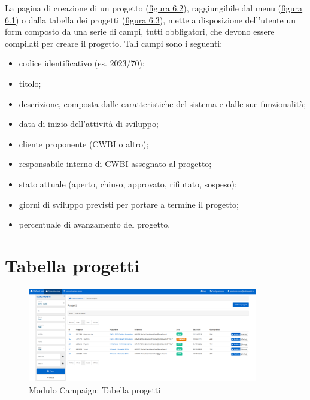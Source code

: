 \noindent La pagina di creazione di un progetto ({\hyperref[fig:nuovoProgetto]{figura 6.2}}), raggiungibile dal menu ({\hyperref[fig:menu]{figura 6.1}}) o dalla tabella dei progetti ({\hyperref[fig:tabellaProgetti]{figura 6.3}}), mette a disposizione dell'utente un form composto da una serie di campi, tutti obbligatori, che devono essere compilati per creare il progetto. Tali campi sono i seguenti:
\begin{itemize}
\item codice identificativo (es. 2023/70);
\item titolo;
\item descrizione, composta dalle caratteristiche del sistema e dalle sue funzionalità;
\item data di inizio dell'attività di sviluppo;
\item cliente proponente (CWBI o altro);
\item responsabile interno di CWBI assegnato al progetto;
\item stato attuale (aperto, chiuso, approvato, rifiutato, sospeso);
\item giorni di sviluppo previsti per portare a termine il progetto;
\item percentuale di avanzamento del progetto.
\end{itemize}

\pagebreak

\section{Tabella progetti}
\begin{figure}[!h]
\centering
\includegraphics[width=380px]{../images/UI/03-tabellaProgetti.png}
\caption{Modulo Campaign: Tabella progetti}
\label{fig:tabellaProgetti}
\end{figure}

